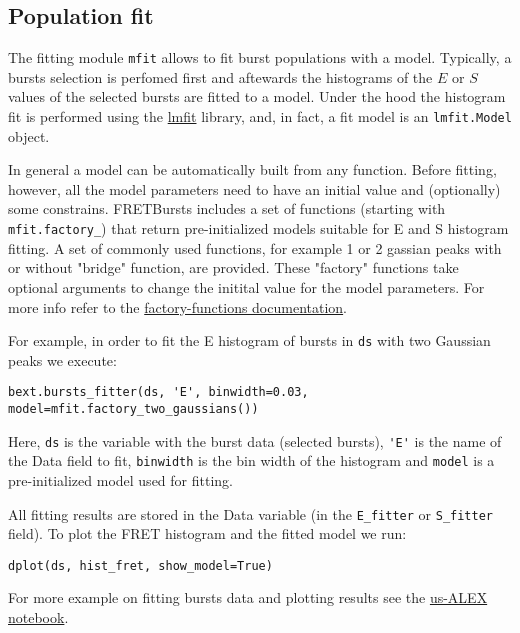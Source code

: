 
\subsection{Population fit}

The fitting module \verb|mfit| allows to fit burst populations with a model. Typically, a bursts selection is perfomed first and aftewards the histograms of the $E$ or $S$ values of the selected bursts are fitted to a model. Under the hood the histogram fit is performed using the \href{http://lmfit.github.io/lmfit-py/}{lmfit} library, and, in fact, 
a fit model is an \verb|lmfit.Model| object.

In general a model can be automatically built from any function. Before fitting, however, all the model parameters need to have an initial value and (optionally) some constrains. FRETBursts includes a set of functions (starting with \verb|mfit.factory_|) that return pre-initialized models suitable for E and S histogram fitting. A set of commonly used functions, for example 1 or 2 gassian peaks with or without "bridge" function, are provided. These "factory" functions take optional arguments to change the initital value for the model parameters. For more info refer to the
\href{http://fretbursts.readthedocs.org/en/latest/mfit.html#model-factory-functions}{factory-functions documentation}.

For example, in order to fit the E histogram of bursts in \verb|ds| with two Gaussian peaks we execute:

\begin{verbatim}
bext.bursts_fitter(ds, 'E', binwidth=0.03, model=mfit.factory_two_gaussians())
\end{verbatim}

Here, \verb|ds| is the variable with the burst data (selected bursts), \verb|'E'| is the name of the Data field to fit, \verb|binwidth| is the bin width of the histogram and \verb|model| is a pre-initialized model used for fitting.

All fitting results are stored in the Data variable (in the \verb|E_fitter| or \verb|S_fitter| field).
To plot the FRET histogram and the fitted model we run:

\begin{verbatim}
dplot(ds, hist_fret, show_model=True)
\end{verbatim}

For more example on fitting bursts data and plotting results see the \href{http://nbviewer.ipython.org/urls/raw.github.com/tritemio/FRETBursts_notebooks/master/notebooks/FRETBursts\%2520-\%2520us-ALEX\%2520smFRET\%2520burst\%2520analysis.ipynb}{us-ALEX notebook}.

